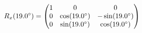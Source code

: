 \documentclass[preview]{standalone}
\begin{document}
\begin{align*}
\special{dvisvgm:raw <g id='unique000'>}R_x(19.0^\circ) = \begin{pmatrix} 1 & 0 & 0 \\ 0 & \cos(19.0^\circ) & -\sin(19.0^\circ) \\ 0 & \sin(19.0^\circ) & \cos(19.0^\circ) \end{pmatrix}\special{dvisvgm:raw </g>}
\end{align*}
\end{document}
